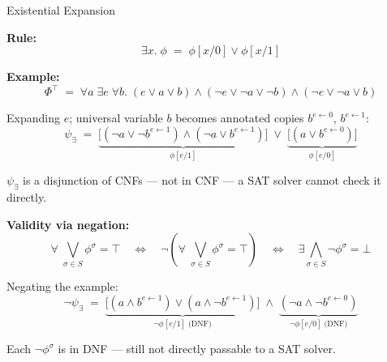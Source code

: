 \documentclass[utf8,aspectratio=169,ngerman,english]{beamer}
\begin{document}
    
    \begin{frame}{Existential Expansion}
    
    \tiny
    
    \textbf{Rule:}
    \[
        \exists x.\; \phi \;=\; \phi[x/0] \vee \phi[x/1]
    \]
    
    \textbf{Example:}
    \[
        \Phi^\top \;=\; \forall a\; \exists e\; \forall b.\;
        (e \vee a \vee b) \wedge
        (\neg e \vee \neg a \vee \neg b) \wedge
        (\neg e \vee \neg a \vee b)
    \]
    
    Expanding $e$; universal variable $b$ becomes annotated copies $b^{e\leftarrow 0}$, $b^{e\leftarrow 1}$:
    \[
        \psi_\exists \;=\;
        \underbrace{\bigl[(\neg a \vee \neg b^{e\leftarrow 1}) \wedge (\neg a \vee b^{e\leftarrow 1})\bigr]}_{\phi[e/1]}
        \;\vee\;
        \underbrace{\bigl[(a \vee b^{e\leftarrow 0})\bigr]}_{\phi[e/0]}
    \]
    
    $\psi_\exists$ is a disjunction of CNFs --- not in CNF --- a SAT solver cannot check it directly.
    
    \textbf{Validity via negation:}
    \[
        \forall\; \bigvee_{\sigma \in S}\phi^\sigma = \top
        \quad\Longleftrightarrow\quad
        \neg (\forall\; \bigvee_{\sigma \in S}\phi^\sigma = \top)
        \quad\Longleftrightarrow\quad
        \exists \bigwedge_{\sigma \in S}\neg\phi^\sigma = \bot
    \]
    
    Negating the example:
    \[
        \neg\psi_\exists \;=\;
        \underbrace{\bigl[(a \wedge b^{e\leftarrow 1}) \vee (a \wedge \neg b^{e\leftarrow 1})\bigr]}_{\neg\phi[e/1]\;\text{(DNF)}}
        \;\wedge\;
        \underbrace{(\neg a \wedge \neg b^{e\leftarrow 0})}_{\neg\phi[e/0]\;\text{(DNF)}}
    \]
    
    Each $\neg\phi^\sigma$ is in DNF --- still not directly passable to a SAT solver.
    
    \end{frame}
    
\end{document}
